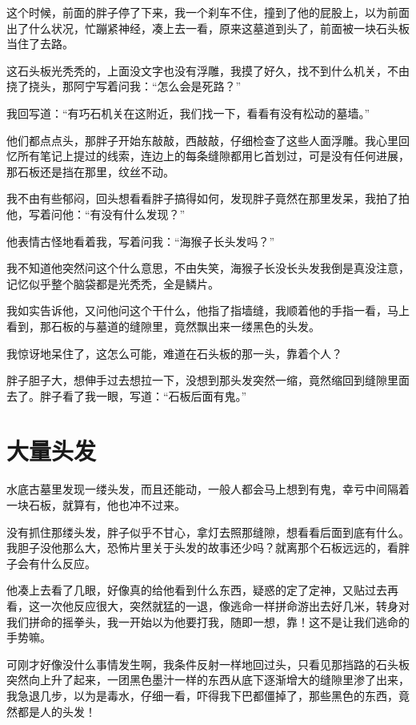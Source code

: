 这个时候，前面的胖子停了下来，我一个刹车不住，撞到了他的屁股上，以为前面出了什么状况，忙蹦紧神经，凑上去一看，原来这墓道到头了，前面被一块石头板当住了去路。

这石头板光秃秃的，上面没文字也没有浮雕，我摸了好久，找不到什么机关，不由挠了挠头，那阿宁写着问我：“怎么会是死路？”

我回写道：“有巧石机关在这附近，我们找一下，看看有没有松动的墓墙。”

他们都点点头，那胖子开始东敲敲，西敲敲，仔细检查了这些人面浮雕。我心里回忆所有笔记上提过的线索，连边上的每条缝隙都用匕首划过，可是没有任何进展，那石板还是挡在那里，纹丝不动。

我不由有些郁闷，回头想看看胖子搞得如何，发现胖子竟然在那里发呆，我拍了拍他，写着问他：“有没有什么发现？”

他表情古怪地看着我，写着问我：“海猴子长头发吗？”

我不知道他突然问这个什么意思，不由失笑，海猴子长没长头发我倒是真没注意，记忆似乎整个脑袋都是光秃秃，全是鳞片。

我如实告诉他，又问他问这个干什么，他指了指墙缝，我顺着他的手指一看，马上看到，那石板的与墓道的缝隙里，竟然飘出来一缕黑色的头发。

我惊讶地呆住了，这怎么可能，难道在石头板的那一头，靠着个人？

胖子胆子大，想伸手过去想拉一下，没想到那头发突然一缩，竟然缩回到缝隙里面去了。胖子看了我一眼，写道：“石板后面有鬼。”

\chapter{大量头发}

水底古墓里发现一缕头发，而且还能动，一般人都会马上想到有鬼，幸亏中间隔着一块石板，就算有，他也冲不过来。

没有抓住那缕头发，胖子似乎不甘心，拿灯去照那缝隙，想看看后面到底有什么。我胆子没他那么大，恐怖片里关于头发的故事还少吗？就离那个石板远远的，看胖子会有什么反应。

他凑上去看了几眼，好像真的给他看到什么东西，疑惑的定了定神，又贴过去再看，这一次他反应很大，突然就猛的一退，像逃命一样拼命游出去好几米，转身对我们拼命的摇拳头，我一开始以为他要打我，随即一想，靠！这不是让我们逃命的手势嘛。

可刚才好像没什么事情发生啊，我条件反射一样地回过头，只看见那挡路的石头板突然向上升了起来，一团黑色墨汁一样的东西从底下逐渐增大的缝隙里渗了出来，我急退几步，以为是毒水，仔细一看，吓得我下巴都僵掉了，那些黑色的东西，竟然都是人的头发！

